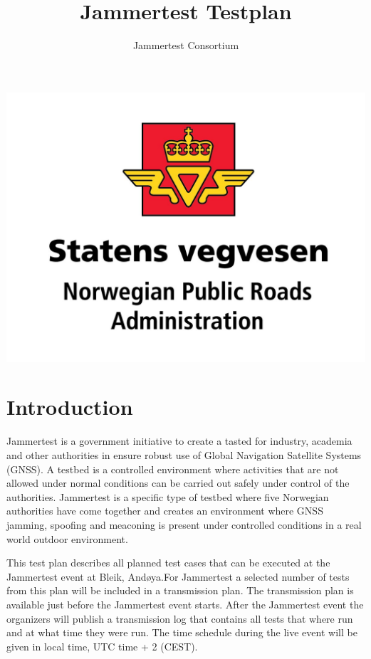 \documentclass{book}
\title{Jammertest Testplan}
\author{Jammertest Consortium}
\date{ }
\begin{document}
\maketitle
\includegraphics[scale=0.1]{graphics/NPRA.png}

\tableofcontents

\section{Introduction}
Jammertest is a government initiative to create a tasted for industry, academia and other authorities in ensure robust use of Global Navigation Satellite Systems (GNSS). A testbed is a controlled environment where activities that are not allowed under normal conditions can be carried out safely under control of the authorities. Jammertest is a specific type of testbed where five Norwegian authorities have come together and creates an environment where GNSS jamming, spoofing and meaconing is present under controlled conditions in a real world outdoor environment.

This test plan describes all planned test cases that can be executed at the Jammertest event at Bleik, Andøya.For Jammertest a selected number of tests from this plan will be included in a transmission plan. The transmission plan is available just before the Jammertest event starts. After the Jammertest event the organizers will publish a transmission log that contains all tests that where run and at what time they were run. The time schedule during the live event will be given in local time, UTC time + 2 (CEST).
\end{document}
